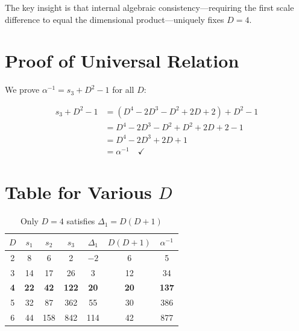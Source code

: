 \documentclass[12pt,a4paper]{article}
\begin{document}
The key insight is that internal algebraic consistency—requiring the first scale difference to equal the dimensional product—uniquely fixes $D = 4$.

\appendix

\section{Proof of Universal Relation}

We prove $\alpha^{-1} = s_3 + D^2 - 1$ for all $D$:

\begin{align*}
s_3 + D^2 - 1 &= (D^4 - 2D^3 - D^2 + 2D + 2) + D^2 - 1 \\
&= D^4 - 2D^3 - D^2 + D^2 + 2D + 2 - 1 \\
&= D^4 - 2D^3 + 2D + 1 \\
&= \alpha^{-1} \quad \checkmark
\end{align*}

\section{Table for Various $D$}

\begin{table}[h]
\centering
\begin{tabular}{ccccccc}
\toprule
$D$ & $s_1$ & $s_2$ & $s_3$ & $\Delta_1$ & $D(D+1)$ & $\alpha^{-1}$ \\
\midrule
2 & 8 & 6 & 2 & $-2$ & 6 & 5 \\
3 & 14 & 17 & 26 & 3 & 12 & 34 \\
\textbf{4} & \textbf{22} & \textbf{42} & \textbf{122} & \textbf{20} & \textbf{20} & \textbf{137} \\
5 & 32 & 87 & 362 & 55 & 30 & 386 \\
6 & 44 & 158 & 842 & 114 & 42 & 877 \\
\bottomrule
\end{tabular}
\caption{Only $D=4$ satisfies $\Delta_1 = D(D+1)$}
\end{table}
\end{document}
